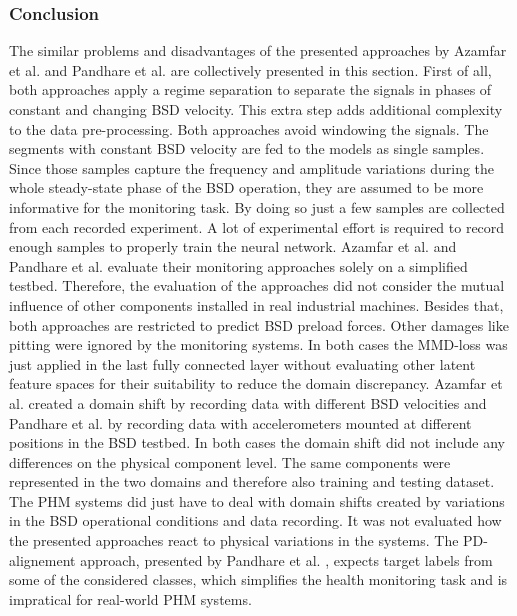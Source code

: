 \subsubsection{Conclusion}
The similar problems and disadvantages of the presented approaches by Azamfar et al. \cite{AZAMFAR2020103932} and Pandhare et al. \cite{Pandhare2021} are collectively presented in this section. First of all, both approaches apply a regime separation to separate the signals in phases of constant and changing BSD velocity. This extra step adds additional complexity to the data pre-processing. Both approaches avoid windowing the signals. The segments with constant BSD velocity are fed to the models as single samples. Since those samples capture the frequency and amplitude variations during the whole steady-state phase of the BSD operation, they are assumed to be more informative for the monitoring task. By doing so just a few samples are collected from each recorded experiment. A lot of experimental effort is required to record enough samples to properly train the neural network. Azamfar et al. \cite{AZAMFAR2020103932} and  Pandhare et al. \cite{Pandhare2021} evaluate their monitoring approaches solely on a simplified testbed. Therefore, the evaluation of the approaches did not consider the mutual influence of other components installed in real industrial machines. Besides that, both approaches are restricted to predict BSD preload forces. Other damages like pitting were ignored by the monitoring systems. In both cases the MMD-loss was just applied in the last fully connected layer without evaluating other latent feature spaces for their suitability to reduce the domain discrepancy. Azamfar et al. \cite{AZAMFAR2020103932} created a domain shift by recording data with different BSD velocities and Pandhare et al. \cite{Pandhare2021} by recording data with accelerometers mounted at different positions in the BSD testbed. In both cases the domain shift did not include any differences on the physical component level. The same components were represented in the two domains and therefore also training and testing dataset. The PHM systems did just have to deal with domain shifts created by variations in the BSD operational conditions and data recording. It was not evaluated how the presented approaches react to physical variations in the systems. The PD-alignement approach, presented by Pandhare et al.  \cite{Pandhare2021}, expects target labels from some of the considered classes, which simplifies the health monitoring task and is impratical for real-world PHM systems.

